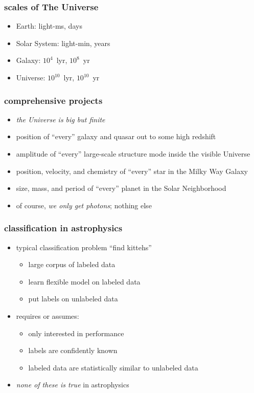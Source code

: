 \documentclass[pdftex]{beamer}
\begin{document}
\begin{frame}
  \frametitle{scales of The Universe}
  \begin{itemize}
  \item Earth: light-ms, days
  \item Solar System: light-min, years
  \item Galaxy: $10^4$~lyr, $10^8$~yr
  \item Universe: $10^{10}$~lyr, $10^{10}$~yr
  \end{itemize}
\end{frame}

\begin{frame}
  \frametitle{comprehensive projects}
  \begin{itemize}
  \item \emph{the Universe is big but finite}
  \item<2> position of ``every'' galaxy and quasar out to some high redshift
  \item<2> amplitude of ``every'' large-scale structure mode inside the visible Universe
  \item<2> position, velocity, and chemistry of ``every'' star in the Milky Way Galaxy
  \item<2> size, mass, and period of ``every'' planet in the Solar Neighborhood
  \item<3> of course, \emph{we only get photons}; nothing else
  \end{itemize}
\end{frame}

\begin{frame}
  \frametitle{classification in astrophysics}
  \begin{itemize}
  \item typical classification problem ``find kittehs''
    \begin{itemize}
    \item large corpus of labeled data
    \item learn flexible model on labeled data
    \item put labels on unlabeled data
    \end{itemize}
  \item requires or assumes:
    \begin{itemize}
    \item only interested in performance
    \item labels are confidently known
    \item labeled data are statistically similar to unlabeled data
    \end{itemize}
  \item<2> \emph{none of these is true} in astrophysics
  \end{itemize}
\end{frame}
\end{document}
